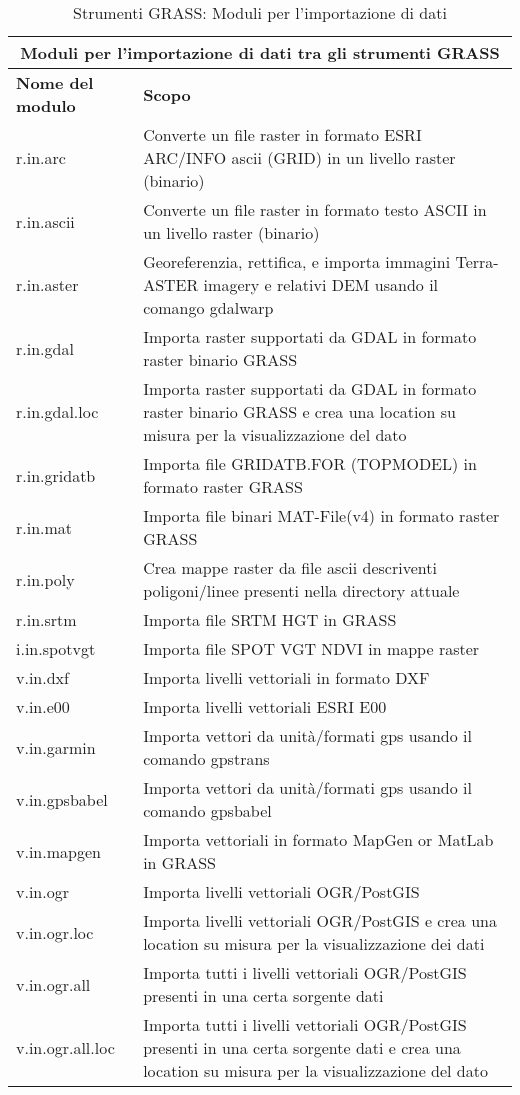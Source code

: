 \begin{table}[ht]
\centering
\caption{Strumenti GRASS: Moduli per l'importazione di dati}\medskip
 \begin{tabular}{|p{4cm}|p{12cm}|}
  \hline \multicolumn{2}{|c|}{\textbf{Moduli per l'importazione di dati tra gli strumenti GRASS}} \\ 
  \hline \textbf{Nome del modulo} & \textbf{Scopo} \\
  \hline r.in.arc & Converte un file raster in formato ESRI ARC/INFO ascii (GRID) in un livello raster (binario)\\
  \hline r.in.ascii & Converte un file raster in formato testo ASCII in un livello raster (binario) \\
  \hline r.in.aster & Georeferenzia, rettifica, e importa immagini Terra-ASTER imagery e relativi DEM usando il comango gdalwarp \\
  \hline r.in.gdal &  Importa raster supportati da GDAL in formato raster binario GRASS \\
  \hline r.in.gdal.loc &  Importa raster supportati da GDAL in formato raster binario GRASS e crea una location su misura per la visualizzazione del dato \\
  \hline r.in.gridatb & Importa file GRIDATB.FOR (TOPMODEL) in formato raster GRASS \\
  \hline r.in.mat  & Importa file binari MAT-File(v4) in formato raster GRASS  \\
  \hline r.in.poly  &  Crea mappe raster da file ascii descriventi poligoni/linee presenti nella directory attuale \\
  \hline r.in.srtm  & Importa file SRTM HGT in GRASS \\
  \hline i.in.spotvgt & Importa file SPOT VGT NDVI in mappe raster \\
  \hline v.in.dxf & Importa livelli vettoriali in formato DXF \\
  \hline v.in.e00 & Importa livelli vettoriali ESRI E00 \\
  \hline v.in.garmin & Importa vettori da unità/formati gps usando il comando gpstrans \\
  \hline v.in.gpsbabel & Importa vettori da unità/formati gps usando il comando gpsbabel \\
  \hline v.in.mapgen & Importa vettoriali in formato MapGen or MatLab in GRASS \\
  \hline v.in.ogr & Importa livelli vettoriali OGR/PostGIS \\
  \hline v.in.ogr.loc & Importa livelli vettoriali OGR/PostGIS e crea una location su misura per la visualizzazione dei dati \\
  \hline v.in.ogr.all & Importa tutti i livelli vettoriali OGR/PostGIS presenti in una certa sorgente dati \\
  \hline v.in.ogr.all.loc & Importa tutti i livelli vettoriali OGR/PostGIS presenti in una certa sorgente dati e crea una location su misura per la visualizzazione del dato \\
\hline
\end{tabular}
\end{table}

